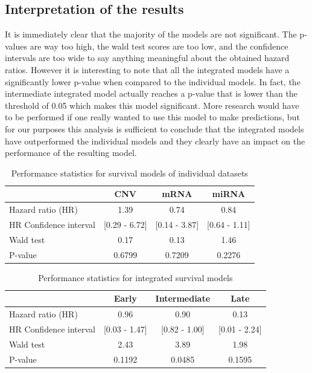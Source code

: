 \subsection{Interpretation of the results}
It is immediately clear that the majority of the models are not significant. The p-values are way too high, the wald test scores are too low, and the confidence intervals are too wide to say anything meaningful about the obtained hazard ratios. However it is interesting to note that all the integrated models have a significantly lower p-value when compared to the individual models. In fact, the intermediate integrated model actually reaches a p-value that is lower than the threshold of 0.05 which makes this model significant. More research would have to be performed if one really wanted to use this model to make predictions, but for our purposes this analysis is sufficient to conclude that the integrated models have outperformed the individual models and they clearly have an impact on the performance of the resulting model.
\begin{table}
	\centering
	\begin{tabular}{lccc}
		\toprule
		 & CNV    & mRNA & miRNA \\
		\midrule
		Hazard ratio (HR) 			& 1.39	& 0.74	& 0.84	\\
		HR Confidence interval 		& [0.29 - 6.72]	& [0.14 - 3.87]	& [0.64 - 1.11] \\
		Wald test 					& 0.17 & 0.13  & 1.46 \\
		P-value 					& 0.6799 & 0.7209  & 0.2276 \\
		\bottomrule
	\end{tabular}
	\caption{Performance statistics for survival models of individual datasets}
	\label{tab:evaluation-surv-individual}
\end{table}

\begin{table}
	\centering
	\begin{tabular}{lccc} 
		\toprule
		& Early & Intermediate & Late\\
		\midrule
		Hazard ratio (HR) 			& 0.96	& 0.90 & 0.13	\\
		HR Confidence interval 		& [0.03 - 1.47]	& [0.82 - 1.00] & [0.01 - 2.24]	\\
		Wald test 					& 2.43 & 3.89 & 1.98 \\
		P-value 					& 0.1192 & 0.0485 & 0.1595 \\
		\bottomrule
	\end{tabular}
	\caption{Performance statistics for integrated survival models}
	\label{tab:evaluation-surv-integrated}
\end{table}

